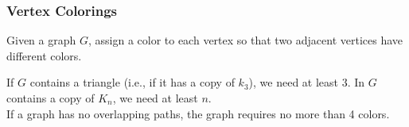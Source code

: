 \documentclass{article}
\begin{document}
\newpage

        \subsubsection{Vertex Colorings}

            \begin{definition}
                Given a graph $G$, assign a color to each vertex so that two adjacent vertices have different colors.
            \end{definition}

            \noindent If $G$ contains a triangle (i.e., if it has a copy of $k_3$), we need at least 3. In $G$ contains a copy of $K_n$, we need at least $n$. \\

            If a graph has no overlapping paths, the graph requires no more than 4 colors.

            \hfill
\end{document}
